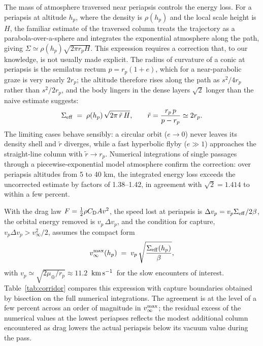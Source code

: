 \documentclass[twocolumn]{aastex701}
\newcommand{\vinf}{v_{\infty}}
\newcommand{\kms}{\ensuremath{{\rm \,km\,s^{-1}}}}
\begin{document}
The mass of atmosphere traversed near periapsis controls the energy loss.
For a periapsis at altitude $h_{p}$, where the density is $\rho(h_{p})$ and
the local scale height is $H$, the familiar estimate of the traversed
column treats the trajectory as a parabola-over-a-sphere and integrates the
exponential atmosphere along the path, giving $\Sigma \simeq
\rho(h_{p})\sqrt{2\pi r_{p} H}$. This expression requires a correction
that, to our knowledge, is not usually made explicit. The radius of
curvature of a conic at periapsis is the semilatus rectum $p = r_{p}(1+e)$,
which for a near-parabolic graze is very nearly $2r_{p}$; the altitude
therefore rises along the path as $s^{2}/4r_{p}$ rather than
$s^{2}/2r_{p}$, and the body lingers in the dense layers $\sqrt{2}$ longer
than the naive estimate suggests:
\begin{equation}
\Sigma_{\rm eff} \;=\; \rho(h_{p})\,\sqrt{2\pi\,\tilde{r}\,H},
\qquad \tilde{r} = \frac{r_{p}\,p}{p - r_{p}} \simeq 2r_{p}.
\label{eq:column}
\end{equation}
The limiting cases behave sensibly: a circular orbit ($e \rightarrow 0$)
never leaves its density shell and $\tilde{r}$ diverges, while a fast
hyperbolic flyby ($e \gg 1$) approaches the straight-line column with
$\tilde{r} \rightarrow r_{p}$. Numerical integrations of single passages
through a piecewise-exponential model atmosphere \citep{vallado2013}
confirm the correction: over periapsis altitudes from 5 to 40 km, the
integrated energy loss exceeds the uncorrected estimate by factors of
1.38--1.42, in agreement with $\sqrt{2} = 1.414$ to within a few percent.

With the drag law $F = \tfrac{1}{2}\rho C_{\rm D} A v^{2}$, the speed lost
at periapsis is $\Delta v_{p} = v_{p}\Sigma_{\rm eff}/2\beta$, the orbital
energy removed is $v_{p}\,\Delta v_{p}$, and the condition for capture,
$v_{p}\Delta v_{p} > \vinf^{2}/2$, assumes the compact form
\begin{equation}
\vinf^{\rm max}(h_{p}) \;=\; v_{p}\,
\sqrt{\frac{\Sigma_{\rm eff}(h_{p})}{\beta}},
\label{eq:vinfmax}
\end{equation}
with $v_{p} \simeq \sqrt{2\mu_{\oplus}/r_{p}} \approx 11.2$ \kms\ for the
slow encounters of interest. Table~\ref{tab:corridor} compares this
expression with capture boundaries obtained by bisection on the full
numerical integrations. The agreement is at the level of a few percent
across an order of magnitude in $\vinf^{\rm max}$; the residual excess of
the numerical values at the lowest periapses reflects the modest additional
column encountered as drag lowers the actual periapsis below its vacuum
value during the pass.
\end{document}
